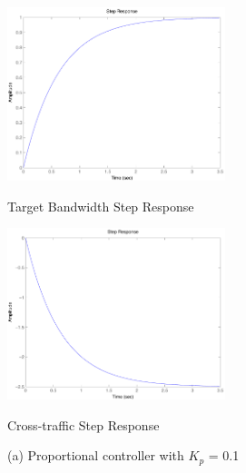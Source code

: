 \documentclass{article}
\begin{document}
\begin{figure}[thbp]
\begin{center} 
\begin{minipage}{0.4\textwidth} 
   \includegraphics[width=2.5in]{plots/trans/P_step_B_01.pdf} 
\centerline{Target Bandwidth Step Response}
\end{minipage}
\hspace{1.2cm}
\begin{minipage}{0.4\textwidth} 
   \includegraphics[width=2.5in]{plots/trans/P_step_x_01.pdf} 
\centerline{Cross-traffic Step Response}
\end{minipage}
\centerline{(a) Proportional controller with $K_p$ = 0.1}\\


\end{center}
\end{figure}
\end{document}
